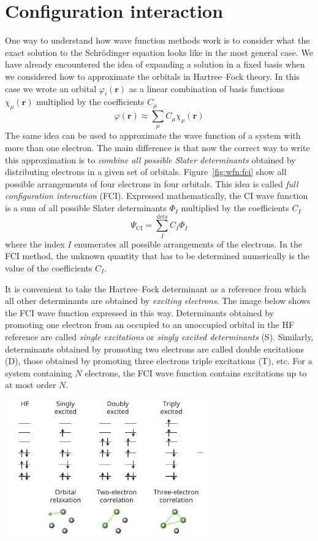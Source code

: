\documentclass[../Main/notes.tex]{subfiles}
\begin{document}
\section{Configuration interaction}



One way to understand how wave function methods work is to consider what the exact solution to the Schr\"{o}dinger equation looks like in the most general case.
We have already encountered the idea of expanding a solution in a fixed basis when we considered how to approximate the orbitals in Hartree--Fock theory.
In this case we wrote an orbital $\varphi_i(\mathbf{r})$ as a linear combination of basis functions $\chi_\mu(\mathbf{r})$ multiplied by the coefficients $C_{\mu}$
\begin{equation}
\varphi(\mathbf{r}) \approx \sum_\mu C_{\mu}\chi_\mu(\mathbf{r})
\end{equation}
The same idea can be used to approximate the wave function of a system with more than one electron.
The main difference is that now the correct way to write this approximation is to \emph{combine all possible Slater determinants} obtained by distributing electrons in a given set of orbitals.
Figure~\ref{fig:wfn:fci} show all possible arrangements of four electrons in four orbitals.
This idea is called \emph{full configuration interaction} (FCI). Expressed mathematically, the CI wave function is a sum of all possible Slater determinants $\Phi_I$ multiplied by the coefficients $C_I$
\begin{equation}
\Psi_\mathrm{CI} = \sum_I^{\text{dets}} C_I \Phi_I
\end{equation}
where the index $I$ enumerates all possible arrangements of the electrons.
In the FCI method, the unknown quantity that has to be determined numerically is the value of the coefficients $C_I$.

It is convenient to take the Hartree--Fock determinant as a reference from which all other determinants are obtained by \emph{exciting electrons}.
The image below shows the FCI wave function expressed in this way.
Determinants obtained by promoting one electron from an occupied to an unoccupied orbital in the HF reference are called \emph{single excitations} or \emph{singly excited determinants} (S).
Similarly, determinants obtained by promoting two electrons are called double excitations (D), those obtained by promoting three electrons triple excitations (T), etc.
For a system containing $N$ electrons, the FCI wave function contains excitations up to at most order $N$.
\begin{center}
\includegraphics[width=3.5in]{img/fci_expansion_simple.pdf}
\end{center}
\end{document}
